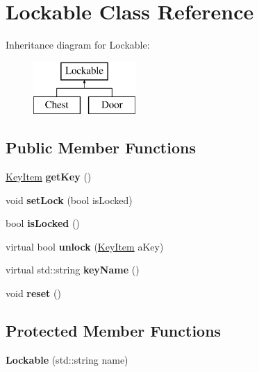 \hypertarget{class_lockable}{}\section{Lockable Class Reference}
\label{class_lockable}
Inheritance diagram for Lockable\+:\begin{figure}[H]
\begin{center}
\leavevmode
\includegraphics[height=2.000000cm]{class_lockable}
\end{center}
\end{figure}
\subsection*{Public Member Functions}
\begin{DoxyCompactItemize}
\item 
\hypertarget{class_lockable_a41cbb1a47f33edbba4e7d8addf464102}{}\label{class_lockable_a41cbb1a47f33edbba4e7d8addf464102} 
\hyperlink{class_key_item}{Key\+Item} {\bfseries get\+Key} ()
\item 
\hypertarget{class_lockable_aa5e0a6889781e0e615503bb2857b81ab}{}\label{class_lockable_aa5e0a6889781e0e615503bb2857b81ab} 
void {\bfseries set\+Lock} (bool is\+Locked)
\item 
\hypertarget{class_lockable_a7050cc99c85178d73aba1fe4c81161f5}{}\label{class_lockable_a7050cc99c85178d73aba1fe4c81161f5} 
bool {\bfseries is\+Locked} ()
\item 
\hypertarget{class_lockable_a64634c5e5ab6142fe99043a8c1e2ea18}{}\label{class_lockable_a64634c5e5ab6142fe99043a8c1e2ea18} 
virtual bool {\bfseries unlock} (\hyperlink{class_key_item}{Key\+Item} a\+Key)
\item 
\hypertarget{class_lockable_a46cd55be38b7bd08e3fe5c39f80e412c}{}\label{class_lockable_a46cd55be38b7bd08e3fe5c39f80e412c} 
virtual std\+::string {\bfseries key\+Name} ()
\item 
\hypertarget{class_lockable_ad4bddb3c5f07a3a6130ac84810e67167}{}\label{class_lockable_ad4bddb3c5f07a3a6130ac84810e67167} 
void {\bfseries reset} ()
\end{DoxyCompactItemize}
\subsection*{Protected Member Functions}
\begin{DoxyCompactItemize}
\item 
\hypertarget{class_lockable_a77a726b41027e421f0735f546d667417}{}\label{class_lockable_a77a726b41027e421f0735f546d667417} 
{\bfseries Lockable} (std\+::string name)
\end{DoxyCompactItemize}
